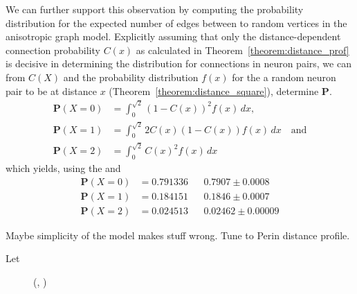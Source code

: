 We can further support this observation by computing the probability
distribution for the expected number of edges between to random
vertices in the anisotropic graph model. Explicitly assuming that only
the distance-dependent connection probability $C(x)$ as calculated in
Theorem~\ref{theorem:distance_prof} is decisive in determining the
distribution for connections in neuron pairs, we can from $C(X)$ and
the probability distribution $f(x)$ for the a random neuron pair to be
at distance $x$ (Theorem~\ref{theorem:distance_square}), determine
\textbf{P}.
\begin{align*}
\mathbf{P}(X=0) & = \int_0^{\sqrt{2}} (1-C(x))^2 f(x)\,
dx, \\
\mathbf{P}(X=1) & = \int_0^{\sqrt{2}} 2 C(x) (1-C(x)) f(x) \, dx \quad \mathrm{and}\\
\mathbf{P}(X=2) & = \int_0^{\sqrt{2}} C(x)^2 f(x) \, dx 
\end{align*}
which yields, using the and
\begin{align*} 
\mathbf{P}(X=0) & = 0.791336 && 0.7907  \pm 0.0008\\
\mathbf{P}(X=1) & = 0.184151 && 0.1846  \pm 0.0007\\
\mathbf{P}(X=2) & = 0.024513 && 0.02462  \pm 0.00009
\end{align*}





Maybe simplicity of the model makes stuff wrong. Tune to Perin
distance profile.

Let 


\begin{figure}[htp]
  \centering
  \vspace{-0.15cm}
  \caption{ (, )} %
  \label{fig:determine_side_length}
\end{figure}

